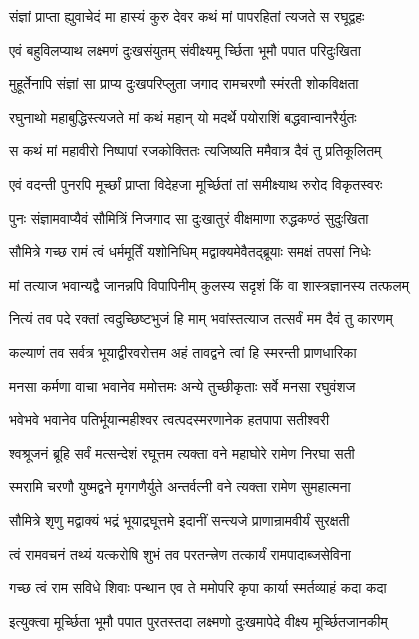 \twolineshloka
{संज्ञां प्राप्ता ह्युवाचेदं मा हास्यं कुरु देवर}
{कथं मां पापरहितां त्यजते स रघूद्वहः}%

\twolineshloka
{एवं बहुविलप्याथ लक्ष्मणं दुःखसंयुतम्}
{संवीक्ष्यमू र्च्छिता भूमौ पपात परिदुःखिता}%

\twolineshloka
{मुहूर्तेनापि संज्ञां सा प्राप्य दुःखपरिप्लुता}
{जगाद रामचरणौ स्मंरती शोकविक्षता}%

\twolineshloka
{रघुनाथो महाबुद्धिस्त्यजते मां कथं महान्}
{यो मदर्थे पयोराशिं बद्धवान्वानरैर्युतः}%

\twolineshloka
{स कथं मां महावीरो निष्पापां रजकोक्तितः}
{त्यजिष्यति ममैवात्र दैवं तु प्रतिकूलितम्}%

\twolineshloka
{एवं वदन्ती पुनरपि मूर्च्छां प्राप्ता विदेहजा}
{मूर्च्छितां तां समीक्ष्याथ रुरोद विकृतस्वरः}%

\twolineshloka
{पुनः संज्ञामवाप्यैवं सौमित्रिं निजगाद सा}
{दुःखातुरं वीक्षमाणा रुद्धकण्ठं सुदुःखिता}%

\twolineshloka
{सौमित्रे गच्छ रामं त्वं धर्ममूर्तिं यशोनिधिम्}
{मद्वाक्यमेवैतद्ब्रूयाः समक्षं तपसां निधेः}%

\twolineshloka
{मां तत्याज भवान्यद्वै जानन्नपि विपापिनीम्}
{कुलस्य सदृशं किं वा शास्त्रज्ञानस्य तत्फलम्}%

\twolineshloka
{नित्यं तव पदे रक्तां त्वदुच्छिष्टभुजं हि माम्}
{भवांस्तत्याज तत्सर्वं मम दैवं तु कारणम्}%

\twolineshloka
{कल्याणं तव सर्वत्र भूयाद्वीरवरोत्तम}
{अहं तावद्वने त्वां हि स्मरन्ती प्राणधारिका}%

\twolineshloka
{मनसा कर्मणा वाचा भवानेव ममोत्तमः}
{अन्ये तुच्छीकृताः सर्वे मनसा रघुवंशज}%

\twolineshloka
{भवेभवे भवानेव पतिर्भूयान्महीश्वर}
{त्वत्पदस्मरणानेक हतपापा सतीश्वरी}%

\twolineshloka
{श्वश्रूजनं ब्रूहि सर्वं मत्सन्देशं रघूत्तम}
{त्यक्ता वने महाघोरे रामेण निरघा सती}%

\twolineshloka
{स्मरामि चरणौ युष्मद्वने मृगगणैर्युते}
{अन्तर्वत्नी वने त्यक्ता रामेण सुमहात्मना}%

\twolineshloka
{सौमित्रे शृणु मद्वाक्यं भद्रं भूयाद्रघूत्तमे}
{इदानीं सन्त्यजे प्राणान्रामवीर्यं सुरक्षती}%

\twolineshloka
{त्वं रामवचनं तथ्यं यत्करोषि शुभं तव}
{परतन्त्त्रेण तत्कार्यं रामपादाब्जसेविना}%

\twolineshloka
{गच्छ त्वं राम सविधे शिवाः पन्थान एव ते}
{ममोपरि कृपा कार्या स्मर्तव्याहं कदा कदा}%

\twolineshloka
{इत्युक्त्वा मूर्च्छिता भूमौ पपात पुरतस्तदा}
{लक्ष्मणो दुःखमापेदे वीक्ष्य मूर्च्छितजानकीम्}%

